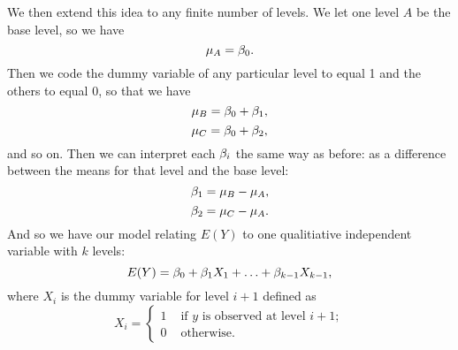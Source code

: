 \documentclass{report}
\begin{document}
	We then extend this idea to any finite number of levels. We let one level $A$ be the base level, so we have 
	$$\mu_A=\beta_0.$$
	Then we code the dummy variable of any particular level to equal 1 and the others to equal 0, so that we have
	$$\mu_B=\beta_0+\beta_1,$$
	$$\mu_C=\beta_0+\beta_2,$$
	and so on. Then we can interpret each $\beta_i$ the same way as before: as a difference between the means for that level and the base level:
	$$\beta_1=\mu_B-\mu_A,$$
	$$\beta_2=\mu_C-\mu_A.$$
	And so we have our model relating $E(Y)$ to one qualitiative independent variable with $k$ levels:
	$$E(Y)=\beta_0+\beta_1X_1+\ldots+\beta_{k-1}X_{k-1},$$
	where $X_i$ is the dummy variable for level $i+1$ defined as
	$$X_i=\begin{cases}
		1 & \text{ if }y\text{ is observed at level }i+1;\\
		0 & \text{ otherwise.}
	\end{cases}$$
\end{document}
